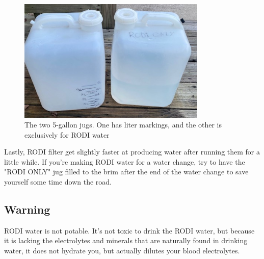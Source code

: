 \documentclass{report}
\begin{document}
\begin{figure}[H]
    \centering
    \includegraphics[width=0.8\textwidth]{Jugs.jpg}
    \caption{The two 5-gallon jugs. One has liter markings, and the other is exclusively for RODI water}
\end{figure}

Lastly, RODI filter get slightly faster at producing water after running them for a little while. If you're making RODI water 
for a water change, try to have the "RODI ONLY" jug filled to the brim after the end of the water change to save yourself some
time down the road. 

\subsection{Warning}
RODI water is not potable. It's not toxic to drink the RODI water, but because it is lacking the electrolytes and minerals that are
naturally found in drinking water, it does not hydrate you, but actually dilutes your blood electrolytes. 

\newpage
\end{document}
